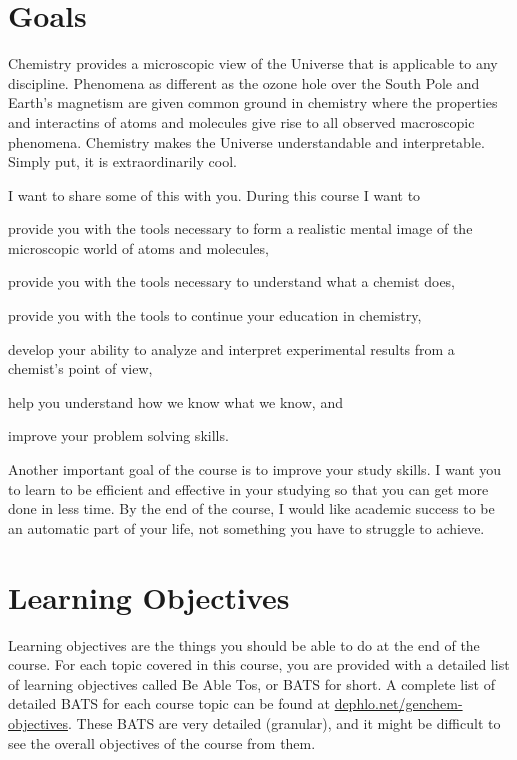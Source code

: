 \documentclass[letterpaper,oneside,onecolumn,11pt,article]{memoir}
\begin{document}
\section{Goals}

Chemistry provides a microscopic view of the Universe that is applicable to any discipline. Phenomena as different as the ozone hole over the South Pole and Earth's magnetism are given common ground in chemistry where the properties and interactins of atoms and molecules give rise to all observed macroscopic phenomena. Chemistry makes the Universe understandable and interpretable. Simply put, it is extraordinarily cool. 

I want to share some of this with you. During this course I want to 
\begin{inparaenum}
\item provide you with the tools necessary to form a realistic mental image of the microscopic world of atoms and molecules,
\item provide you with the tools necessary to understand what a chemist does,
\item provide you with the tools to continue your education in chemistry,
\item develop your ability to analyze and interpret experimental results from a chemist's point of view,
\item help you understand how we know what we know, and
\item improve your problem solving skills.
\end{inparaenum}

Another important goal of the course is to improve your study skills. I want you to learn to be efficient and effective in your studying so that you can get more done in less time. By the end of the course, I would like academic success to be an automatic part of your life, not something you have to struggle to achieve. 
\section{Learning Objectives}

Learning objectives are the things you should be able to do at the end of the course. For each topic covered in this course, you are provided with a detailed list of learning objectives called Be Able Tos, or BATS for short. A complete list of detailed BATS for each course topic can be found at \href{http://dephlo.net/chem110/lecture/objectives}{dephlo.net/genchem-objectives}. These BATS are very detailed (granular), and it might be difficult to see the overall objectives of the course from them. 
\end{document}
